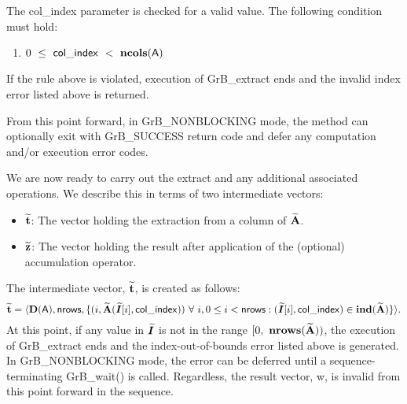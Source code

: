 The {\sf col\_index} parameter is checked for a valid value.  The following
condition must hold:
\begin{enumerate}
	\item $0\ \leq\ {\sf col\_index} \ <\ \bold{ncols}({\sf A})$
\end{enumerate}
If the rule above is violated, execution of {\sf GrB\_extract} ends 
and the invalid index error listed above is returned.

From this point forward, in {\sf GrB\_NONBLOCKING} mode, the method can 
optionally exit with {\sf GrB\_SUCCESS} return code and defer any computation 
and/or execution error codes.

We are now ready to carry out the extract and any additional 
associated operations.  We describe this in terms of two intermediate vectors:
\begin{itemize}
    \item ${\bf \widetilde{t}}$: The vector holding the extraction from
    a column of ${\bf \widetilde{A}}$.
    \item ${\bf \widetilde{z}}$: The vector holding the result after 
    application of the (optional) accumulation operator.
\end{itemize}

The intermediate vector, ${\bf \widetilde{t}}$, is created as follows:
\[
{\bf \widetilde{t}} = \langle
\bold{D}({\sf A}), {\sf nrows},
\{(i,{\bf \widetilde{A}}(\bm{\widetilde{I}}[i],{\sf col\_index})) \ \forall\ i, 0 \leq i < {\sf nrows} : 
(\bm{\widetilde{I}}[i], {\sf col\_index}) \in 
\bold{ind}({\bf \widetilde{A}}) \} \rangle. 
\]
At this point, if any value in $\bm{\widetilde{I}}$ is not in
the range $[0,\ \bold{nrows}({\bf \widetilde{A}}))$, the execution of
{\sf GrB\_extract} ends and the index-out-of-bounds error listed above is 
generated.  In {\sf GrB\_NONBLOCKING} mode, the error can be deferred until a 
sequence-terminating {\sf GrB\_wait()} is called.  Regardless, the result 
vector, {\sf w}, is invalid from this point forward in the 
sequence.




